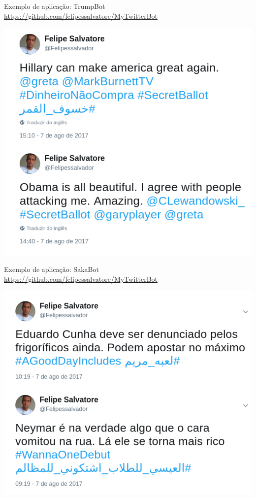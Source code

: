 \documentclass[10pt]{beamer}
\begin{document}
\begin{frame}{Exemplo de aplicação: TrumpBot}
\url{https://github.com/felipessalvatore/MyTwitterBot}
\begin{center}
\includegraphics[scale=0.24]{images/TrumpBot.png}
\end{center}
\end{frame}

\begin{frame}{Exemplo de aplicação: SakaBot}
\url{https://github.com/felipessalvatore/MyTwitterBot}
\begin{center}
\includegraphics[scale=0.24]{images/SakaBot.png}
\end{center}
\end{frame}
\end{document}
